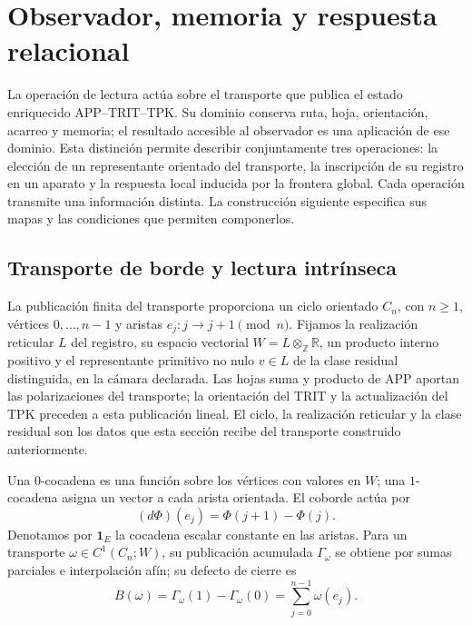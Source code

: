 
\section{Observador, memoria y respuesta relacional}
\label{vii:vii:sec:observador-respuesta}

La operación de lectura actúa sobre el transporte que publica el estado
enriquecido APP--TRIT--TPK. Su dominio conserva ruta, hoja, orientación,
acarreo y memoria; el resultado accesible al observador es una aplicación
de ese dominio. Esta distinción permite describir conjuntamente tres
operaciones: la elección de un representante orientado del transporte,
la inscripción de su registro en un aparato y la respuesta local inducida
por la frontera global. Cada operación transmite una información distinta.
La construcción siguiente especifica sus mapas y las condiciones que
permiten componerlos.

\subsection{Transporte de borde y lectura intrínseca}
\label{vii:vii:sec:observador-ciclo}

La publicación finita del transporte proporciona un ciclo orientado
\(C_n\), con \(n\geq1\), vértices \(0,\ldots,n-1\) y aristas
\(e_j:j\longrightarrow j+1\pmod n\). Fijamos la realización reticular
\(L\) del registro, su espacio vectorial
\(W=L\otimes_{\mathbb Z}\mathbb R\), un producto interno positivo y
el representante primitivo no nulo \(v\in L\) de la clase residual
distinguida, en la cámara declarada. Las hojas suma y producto de APP
aportan las polarizaciones del transporte; la orientación del TRIT y la
actualización del TPK preceden a esta publicación lineal. El ciclo,
la realización reticular y la clase residual son los datos que esta
sección recibe del transporte construido anteriormente.

Una \(0\)-cocadena es una función sobre los vértices con valores en
\(W\); una \(1\)-cocadena asigna un vector a cada arista orientada.
El coborde actúa por
\[
 (d\Phi)(e_j)=\Phi(j+1)-\Phi(j).
\]
Denotamos por \(\mathbf1_E\) la cocadena escalar constante en las
aristas. Para un transporte \(\omega\in C^1(C_n;W)\), su publicación
acumulada \(\Gamma_\omega\) se obtiene por sumas parciales e
interpolación afín; su defecto de cierre es
\begin{equation}
 B(\omega)=\Gamma_\omega(1)-\Gamma_\omega(0)
 =\sum_{j=0}^{n-1}\omega(e_j).
 \label{vii:vii:eq:observador-defecto}
\end{equation}

